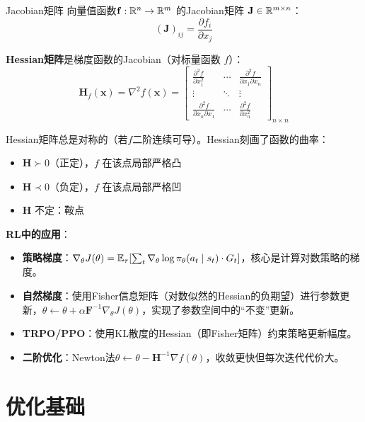 \begin{mydefinition}{Jacobian矩阵}
向量值函数$\mathbf{f}: \mathbb{R}^n \to \mathbb{R}^m$ 的Jacobian矩阵 $\mathbf{J} \in \mathbb{R}^{m \times n}$：
\[
(\mathbf{J})_{ij} = \frac{\partial f_i}{\partial x_j}
\]

\textbf{Hessian矩阵}是梯度函数的Jacobian（对标量函数 $f$）：
\[
\mathbf{H}_f(\mathbf{x}) = \nabla^2 f(\mathbf{x}) = \begin{bmatrix}
\frac{\partial^2 f}{\partial x_1^2} & \cdots & \frac{\partial^2 f}{\partial x_1 \partial x_n} \\
\vdots & \ddots & \vdots \\
\frac{\partial^2 f}{\partial x_n \partial x_1} & \cdots & \frac{\partial^2 f}{\partial x_n^2}
\end{bmatrix}_{n \times n}
\]
\end{mydefinition}

Hessian矩阵总是对称的（若$f$二阶连续可导）。Hessian刻画了函数的曲率：
\begin{itemize}
    \item $\mathbf{H} \succ 0$（正定），$f$ 在该点局部严格凸
    \item $\mathbf{H} \prec 0$（负定），$f$ 在该点局部严格凹
    \item $\mathbf{H}$ 不定：鞍点
\end{itemize}

\begin{remark} \textbf{RL中的应用}：
\begin{itemize}
    \item \textbf{策略梯度}：$\nabla_\theta J(\theta) = \mathbb{E}_\tau[\sum_t \nabla_\theta \log \pi_\theta(a_t \mid s_t) \cdot G_t]$，核心是计算对数策略的梯度。
    \item \textbf{自然梯度}：使用Fisher信息矩阵（对数似然的Hessian的负期望）进行参数更新，$\theta \leftarrow \theta + \alpha \mathbf{F}^{-1} \nabla_\theta J(\theta)$，实现了参数空间中的``不变''更新。
    \item \textbf{TRPO/PPO}：使用KL散度的Hessian（即Fisher矩阵）约束策略更新幅度。
    \item \textbf{二阶优化}：Newton法$\theta \leftarrow \theta - \mathbf{H}^{-1} \nabla f(\theta)$，收敛更快但每次迭代代价大。
\end{itemize}
\end{remark}

\section{优化基础}

